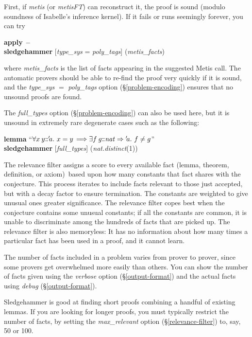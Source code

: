 \documentclass[a4paper,12pt]{article}
\def\Colon{\mathord{:\mkern-1.5mu:}}
\begin{document}

First, if \emph{metis} (or \emph{metisFT}) can reconstruct it, the proof is
sound (modulo soundness of Isabelle's inference kernel). If it fails or runs
seemingly forever, you can try

\prew
\textbf{apply}~\textbf{--} \\
\textbf{sledgehammer} [\textit{type\_sys} = \textit{poly\_tags}] (\textit{metis\_facts})
\postw

where \textit{metis\_facts} is the list of facts appearing in the suggested
Metis call. The automatic provers should be able to re-find the proof very
quickly if it is sound, and the \textit{type\_sys} $=$ \textit{poly\_tags}
option (\S\ref{problem-encoding}) ensures that no unsound proofs are found.

The \textit{full\_types} option (\S\ref{problem-encoding}) can also be used
here, but it is unsound in extremely rare degenerate cases such as the
following:

\prew
\textbf{lemma} ``$\forall x\> y\Colon{'}\!a.\ x = y \,\Longrightarrow \exists f\> g\Colon\mathit{nat} \Rightarrow {'}\!a.\ f \not= g$'' \\
\textbf{sledgehammer} [\textit{full\_types}] (\textit{nat.distinct\/}(1))
\postw


The relevance filter assigns a score to every available fact (lemma, theorem,
definition, or axiom)\ based upon how many constants that fact shares with the
conjecture. This process iterates to include facts relevant to those just
accepted, but with a decay factor to ensure termination. The constants are
weighted to give unusual ones greater significance. The relevance filter copes
best when the conjecture contains some unusual constants; if all the constants
are common, it is unable to discriminate among the hundreds of facts that are
picked up. The relevance filter is also memoryless: It has no information about
how many times a particular fact has been used in a proof, and it cannot learn.

The number of facts included in a problem varies from prover to prover, since
some provers get overwhelmed more easily than others. You can show the number of
facts given using the \textit{verbose} option (\S\ref{output-format}) and the
actual facts using \textit{debug} (\S\ref{output-format}).

Sledgehammer is good at finding short proofs combining a handful of existing
lemmas. If you are looking for longer proofs, you must typically restrict the
number of facts, by setting the \textit{max\_relevant} option
(\S\ref{relevance-filter}) to, say, 50 or 100.
\end{document}
